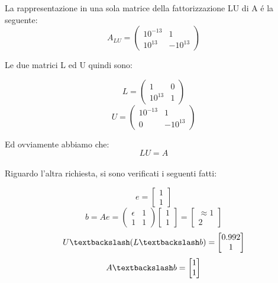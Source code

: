 \begin{center}
\footnotesize\noindent{}\end{center}

\noindent La rappresentazione in una sola matrice della fattorizzazione LU di A \'e la seguente:
\[
A_{LU} = \begin{pmatrix} 10^{-13} & 1 \\ 10^{13} & -10^{13}\end{pmatrix}
\]

\noindent Le due matrici L ed U quindi sono:

\[
L = \begin{pmatrix} 1 & 0 \\ 10^{13} & 1\end{pmatrix}\]
\[
U = \begin{pmatrix} 10^{-13} & 1 \\ 0 & -10^{13}\end{pmatrix}
\]

\noindent Ed ovviamente abbiamo che:
\[
LU = A
\]
\\

\noindent Riguardo l'altra richiesta, si sono verificati i seguenti fatti:

\[
e = \begin{bmatrix} 1 \\ 1\end{bmatrix}
\]
\[
b = Ae = \begin{pmatrix} \epsilon & 1 \\ 1 & 1 \end{pmatrix} \begin{bmatrix} 1 \\ 1\end{bmatrix} = \begin{bmatrix} \approx 1 \\ 2 \end{bmatrix}
\]
\[
U \textbackslash (L \textbackslash b) = \begin{bmatrix} 0.992 \\ 1\end{bmatrix}
\]
\[
A \textbackslash b = \begin{bmatrix} 1 \\ 1\end{bmatrix}
\]

